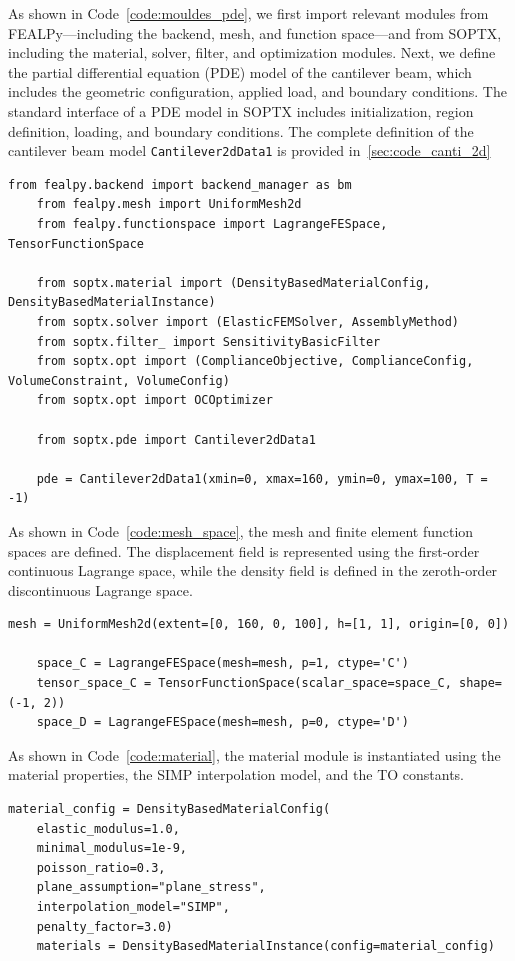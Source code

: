 \documentclass[mathpazo]{cicp}
\begin{document}
As shown in Code~\ref{code:mouldes_pde}, we first import relevant modules from FEALPy---including the backend, mesh, and function space---and from SOPTX, including the material, solver, filter, and optimization modules. Next, we define the partial differential equation (PDE) model of the cantilever beam, which includes the geometric configuration, applied load, and boundary conditions. The standard interface of a PDE model in SOPTX includes initialization, region definition, loading, and boundary conditions. The complete definition of the cantilever beam model \texttt{Cantilever2dData1} is provided in~\ref{sec:code_canti_2d}
\begin{lstlisting}[caption={Module imports and PDE model}, label={code:mouldes_pde}]
	from fealpy.backend import backend_manager as bm
	from fealpy.mesh import UniformMesh2d
	from fealpy.functionspace import LagrangeFESpace, TensorFunctionSpace
	
	from soptx.material import (DensityBasedMaterialConfig, DensityBasedMaterialInstance)
	from soptx.solver import (ElasticFEMSolver, AssemblyMethod)
	from soptx.filter_ import SensitivityBasicFilter
	from soptx.opt import (ComplianceObjective, ComplianceConfig, VolumeConstraint, VolumeConfig)
	from soptx.opt import OCOptimizer
	
	from soptx.pde import Cantilever2dData1
	
	pde = Cantilever2dData1(xmin=0, xmax=160, ymin=0, ymax=100,	T = -1)
\end{lstlisting}

As shown in Code~\ref{code:mesh_space}, the mesh and finite element function spaces are defined. The displacement field is represented using the first-order continuous Lagrange space, while the density field is defined in the zeroth-order discontinuous Lagrange space.
\begin{lstlisting}[caption={Mesh and function space definitions}, label={code:mesh_space}]
	mesh = UniformMesh2d(extent=[0, 160, 0, 100], h=[1, 1], origin=[0, 0])
	
	space_C = LagrangeFESpace(mesh=mesh, p=1, ctype='C')
	tensor_space_C = TensorFunctionSpace(scalar_space=space_C, shape=(-1, 2))
	space_D = LagrangeFESpace(mesh=mesh, p=0, ctype='D')
\end{lstlisting}

As shown in Code~\ref{code:material}, the material module is instantiated using the material properties, the SIMP interpolation model, and the TO constants.

\begin{lstlisting}[caption={Material module}, label={code:material}]
	material_config = DensityBasedMaterialConfig(
	elastic_modulus=1.0,            
	minimal_modulus=1e-9,         
	poisson_ratio=0.3,            
	plane_assumption="plane_stress",    
	interpolation_model="SIMP",    
	penalty_factor=3.0)
	materials = DensityBasedMaterialInstance(config=material_config)
\end{lstlisting}
	
\end{document}

